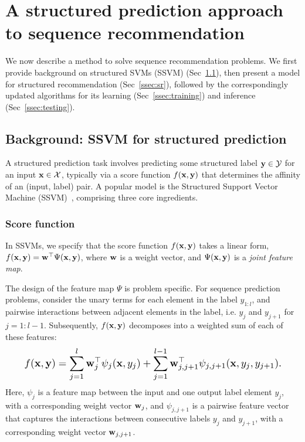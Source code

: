 \section{A structured prediction approach to sequence recommendation}
\label{sec:recseq}

We now describe a method to
solve sequence recommendation problems.
We first provide background on structured SVMs (SSVM) (Sec~\ref{ssec:ssvm}),
then present a model for structured recommendation (Sec~\ref{ssec:sr}),
followed by the correspondingly updated algorithms for its learning (Sec~\ref{ssec:training})
and inference (Sec~\ref{ssec:testing}).


\subsection{Background: SSVM for structured prediction}
\label{ssec:ssvm}

A structured prediction task involves predicting some structured label $\mathbf{y} \in \mathcal{Y}$ for an input $\mathbf{x} \in \mathcal{X}$,
typically via a score function $f(\mathbf{x},\mathbf{y})$ that determines the affinity of an (input, label) pair.
A popular model is the Structured Support Vector Machine (SSVM)~\cite{joachims2009predicting,tsochantaridis2005large}, comprising three core ingredients.

\subsubsection{Score function}
In SSVMs, we specify that the score function $f(\mathbf{x}, \mathbf{y})$ takes a linear form, \ie
$f(\mathbf{x}, \mathbf{y}) = \mathbf{w}^\top \Psi(\mathbf{x}, \mathbf{y})$,
where $\mathbf{w}$ is a weight vector, and $\Psi(\mathbf{x}, \mathbf{y})$ is a \emph{joint feature map}.

The design of the feature map $\Psi$ is problem specific.
For sequence prediction problems,
consider the unary
terms for each element in the label $y_{1:l}$, and pairwise interactions between
adjacent elements in the label,
i.e. $y_j$ and $y_{j+1}$ for $j=1 : l \!-\! 1$.
Subsequently, $f(\mathbf{x},\mathbf{y})$ decomposes into a weighted sum of
each of these features: %
\begin{equation}
\label{eq:jointfeature}
\resizebox{0.909\linewidth}{!}{$\displaystyle
f(\x, \y) = %
\sum_{j=1}^l \w_j^\top \psi_j(\x, y_j) + \sum_{j=1}^{l-1} \w_{j,j+1}^\top \psi_{j,j+1}(\x, y_{j}, y_{j+1}).
$}
\eqmoveup
\end{equation}
Here, $\psi_j$ is a feature map between the input and one output label element $y_j$, with a corresponding weight vector $\mathbf{w}_j$,
and $\psi_{j,j+1}$ is a pairwise feature vector that captures the interactions between consecutive labels $y_j$ and $y_{j+1}$,
with a corresponding weight vector $\mathbf{w}_{j,j+1}$.

